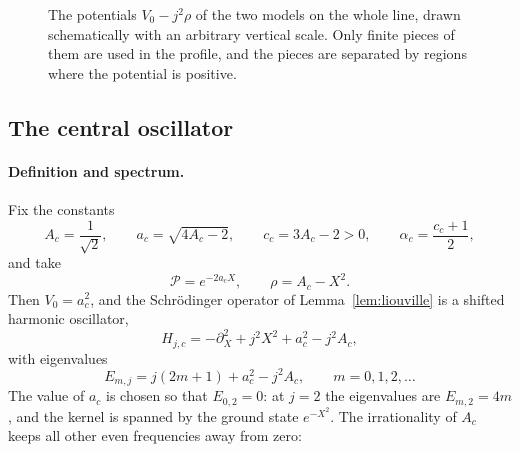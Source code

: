 \begin{figure}[htbp]
\centering
{}
\caption{The potentials $V_0-j^2\rho$ of the two models on the whole
line, drawn schematically with an arbitrary vertical scale. Only
finite pieces of them are used in the profile, and the pieces are
separated by regions where the potential is positive.}
\label{fig:two-spectral-models}
\end{figure}

\subsection{The central oscillator}
\label{subsec:rad-central-singlepoint}

\paragraph{Definition and spectrum.}
Fix the constants
\begin{equation}\label{eq:rad-eq-sc1}
 A_c=\frac1{\sqrt2},\qquad a_c=\sqrt{4A_c-2},\qquad
 c_c=3A_c-2>0,\qquad \alpha_c=\frac{c_c+1}2,
\end{equation}
and take
\[
 \mathcal P=e^{-2a_cX},\qquad \rho=A_c-X^2 .
\]
Then $V_0=a_c^2$, and the Schr\"odinger operator of
Lemma~\ref{lem:liouville} is a shifted harmonic oscillator,
\[
 H_{j,c}=-\partial_X^2+j^2X^2+a_c^2-j^2A_c ,
\]
with eigenvalues \cite[\S8.3, equations (8.33)--(8.42)]{Teschl2009}
\begin{equation}\label{eq:central-spectrum-new}
 E_{m,j}=j(2m+1)+a_c^2-j^2A_c,\qquad m=0,1,2,\ldots
\end{equation}
The value of $a_c$ is chosen so that $E_{0,2}=0$: at $j=2$ the
eigenvalues are $E_{m,2}=4m$, and the kernel is spanned by the ground
state $e^{-X^2}$. The irrationality of $A_c$ keeps all other even
frequencies away from zero:

